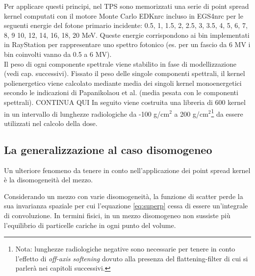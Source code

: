 {Per applicare questi principi, nel TPS sono memorizzati una serie di point spread kernel computati con il motore Monte Carlo EDKnrc incluso in EGS4nrc per le seguenti energie del fotone primario incidente: 0.5, 1, 1.5, 2, 2.5, 3, 3.5, 4, 5, 6, 7, 8, 9 10, 12, 14, 16, 18, 20 MeV. Queste energie corrispondono ai bin implementati in RayStation per rappresentare uno spettro fotonico (es. per un fascio da 6 MV i bin coinvolti vanno da 0.5 a 6 MV).\\
Il peso di ogni componente spettrale viene stabilito in fase di modellizzazione (vedi cap. successivi). Fissato il peso delle singole componenti spettrali, il kernel polienergetico viene calcolato mediante media dei singoli kernel monoenergetici secondo le indicazioni di Papanikolaou et al. \cite{Papanikolaou1993} (media pesata con le componenti spettrali). CONTINUA QUI In seguito viene costruita una libreria di 600 kernel in un intervallo di lunghezze radiologiche da -100 g/cm$^2$ a 200 g/cm$^2$\footnote{Nota: lunghezze radiologiche negative sono necessarie per tenere in conto l'effetto di \textit{off-axis softening} dovuto alla presenza del flattening-filter di cui si parlerà nei capitoli successivi.} da essere utilizzati nel calcolo della dose.


\subsection{La generalizzazione al caso disomogeneo}
Un ulteriore fenomeno da tenere in conto nell'applicazione dei point spread kernel è la disomogeneità del mezzo. 

Considerando un mezzo con varie disomogeneità, la funzione di scatter perde la sua invarianza spaziale per cui l'equazione \eqref{eq:superp} cessa di essere un'integrale di convoluzione. In termini fisici, in un mezzo disomogeneo non sussiste più l'equilibrio di particelle cariche in ogni punto del volume.

}
